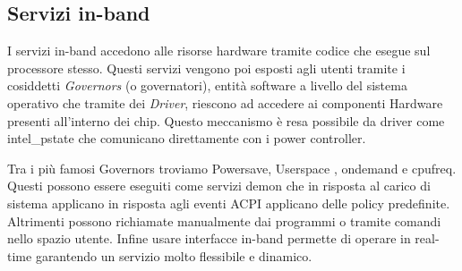 
\subsection{Servizi in-band} %
I servizi in-band accedono alle risorse hardware tramite codice che esegue sul processore stesso. Questi servizi vengono poi esposti agli utenti tramite i cosiddetti \emph{Governors} (o governatori), entità software a livello del sistema operativo che tramite dei \emph{Driver}, riescono ad accedere ai componenti Hardware presenti all'interno dei chip. Questo meccanismo è resa possibile da driver come intel\_pstate che comunicano direttamente con i power controller.


Tra i più famosi Governors troviamo Powersave\cite{TODO}, Userspace \cite{TODO}, ondemand e cpufreq. Questi possono essere eseguiti come servizi demon che in risposta al carico di sistema applicano in risposta agli eventi ACPI applicano delle policy predefinite. Altrimenti possono richiamate manualmente dai programmi o tramite comandi nello spazio utente. Infine usare interfacce in-band permette di operare in real-time garantendo un servizio molto flessibile e dinamico.



